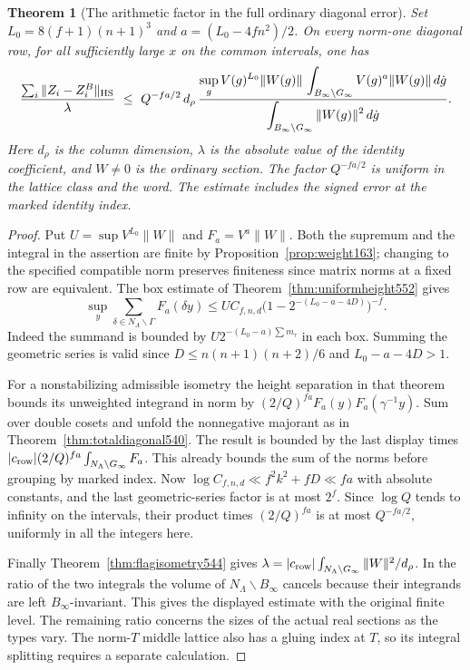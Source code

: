 \documentclass[a4paper,11pt]{article}
\newtheorem{theorem}[proposition]{Theorem}
\theoremstyle{definition}
\theoremstyle{remark}
\numberwithin{equation}{section}
\begin{document}
\begin{theorem}[The arithmetic factor in the full ordinary diagonal error]
\leavevmode\label{thm:ordinaryunit552}
Set \(L_0=8(f+1)(n+1)^3\) and \(a=(L_0-4fn^2)/2\).
On every norm-one diagonal row, for all sufficiently large \(x\)
on the common intervals, one has
\[
 \frac{\sum_i\|Z_i-Z_i^B\|_{\rm HS}}{\lambda}
 \ \le\ Q^{-fa/2}\,d_\rho\,
 \frac{\displaystyle
       \sup_g V(g)^{L_0}\|W(g)\|\,
       \int_{B_\infty\backslash G_\infty}V(g)^a\|W(g)\|\,d\dot g}
      {\displaystyle
       \int_{B_\infty\backslash G_\infty}\|W(g)\|^2\,d\dot g}.
\]
Here \(d_\rho\) is the column dimension, \(\lambda\) is the
absolute value of the identity coefficient, and \(W\ne0\) is
the ordinary section. The factor \(Q^{-fa/2}\) is uniform in
the lattice class and the word. The estimate includes the
signed error at the marked identity index.
\end{theorem}
\begin{proof}
Put \(U=\sup V^{L_0}\|W\|\) and \(F_a=V^a\|W\|\).
Both the supremum and the integral in the assertion are
finite by Proposition~\ref{prop:weight163}; changing to the
specified compatible norm preserves finiteness since matrix
norms at a fixed row are equivalent. The box estimate of
Theorem~\ref{thm:uniformheight552} gives
\[
 \sup_y\sum_{\delta\in N_\Lambda\backslash\Gamma} F_a(\delta y)
 \le U C_{f,n,d}\big(1-2^{-(L_0-a-4D)}\big)^{-f}.
\]
Indeed the summand is bounded by
\(U2^{-(L_0-a)\sum m_\tau}\) in each box. Summing the geometric
series is valid since \(D\le n(n+1)(n+2)/6\) and
\(L_0-a-4D>1\).

For a nonstabilizing admissible isometry the height separation
in that theorem bounds its unweighted integrand in norm by
\((2/Q)^{fa}F_a(y)F_a(\gamma^{-1}y)\). Sum over double cosets
and unfold the nonnegative majorant as in
Theorem~\ref{thm:totaldiagonal540}. The result is bounded by
the last display times
\(|c_{\rm row}|(2/Q)^{fa}\int_{N_\Lambda\backslash G_\infty}F_a\).
This already bounds the sum of the norms before grouping by
marked index. Now \(\log C_{f,n,d}\ll f^2 k^2+fD\ll fa\)
with absolute constants, and the last geometric-series factor
is at most \(2^f\). Since \(\log Q\) tends to infinity on the
intervals, their product times \((2/Q)^{fa}\) is at most
\(Q^{-fa/2}\), uniformly in all the integers here.

Finally Theorem~\ref{thm:flagisometry544} gives
\(\lambda=|c_{\rm row}|\int_{N_\Lambda\backslash G_\infty}
\|W\|^2/d_\rho\). In the ratio of the two integrals the volume
of \(N_\Lambda\backslash B_\infty\) cancels because their
integrands are left \(B_\infty\)-invariant. This gives the
displayed estimate with the original finite level. The
remaining ratio concerns the sizes of the actual real
sections as the types vary. The norm-\(T\) middle lattice
also has a gluing index at \(T\), so its integral splitting
requires a separate calculation.
\end{proof}
\end{document}
